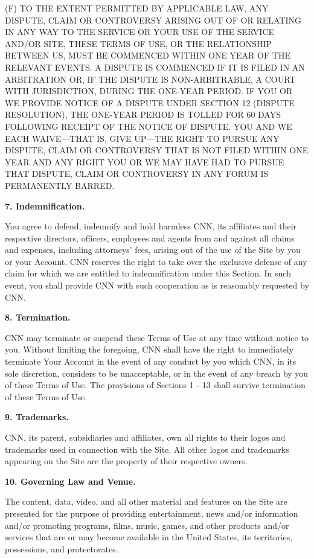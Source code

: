 (F) TO THE EXTENT PERMITTED BY APPLICABLE LAW, ANY DISPUTE, CLAIM OR
CONTROVERSY ARISING OUT OF OR RELATING IN ANY WAY TO THE SERVICE OR YOUR
USE OF THE SERVICE AND/OR SITE, THESE TERMS OF USE, OR THE RELATIONSHIP
BETWEEN US, MUST BE COMMENCED WITHIN ONE YEAR OF THE RELEVANT EVENTS. A
DISPUTE IS COMMENCED IF IT IS FILED IN AN ARBITRATION OR, IF THE DISPUTE
IS NON-ARBITRABLE, A COURT WITH JURISDICTION, DURING THE ONE-YEAR
PERIOD. IF YOU OR WE PROVIDE NOTICE OF A DISPUTE UNDER SECTION 12
(DISPUTE RESOLUTION), THE ONE-YEAR PERIOD IS TOLLED FOR 60 DAYS
FOLLOWING RECEIPT OF THE NOTICE OF DISPUTE. YOU AND WE EACH WAIVE---THAT
IS, GIVE UP---THE RIGHT TO PURSUE ANY DISPUTE, CLAIM OR CONTROVERSY THAT
IS NOT FILED WITHIN ONE YEAR AND ANY RIGHT YOU OR WE MAY HAVE HAD TO
PURSUE THAT DISPUTE, CLAIM OR CONTROVERSY IN ANY FORUM IS PERMANENTLY
BARRED.

\textbf{7. Indemnification.}

You agree to defend, indemnify and hold harmless CNN, its affiliates and
their respective directors, officers, employees and agents from and
against all claims and expenses, including attorneys' fees, arising out
of the use of the Site by you or your Account. CNN reserves the right to
take over the exclusive defense of any claim for which we are entitled
to indemnification under this Section. In such event, you shall provide
CNN with such cooperation as is reasonably requested by CNN.

\textbf{8. Termination.}

CNN may terminate or suspend these Terms of Use at any time without
notice to you. Without limiting the foregoing, CNN shall have the right
to immediately terminate Your Account in the event of any conduct by you
which CNN, in its sole discretion, considers to be unacceptable, or in
the event of any breach by you of these Terms of Use. The provisions of
Sections 1 - 13 shall survive termination of these Terms of Use.

\textbf{9. Trademarks.}

CNN, its parent, subsidiaries and affiliates, own all rights to their
logos and trademarks used in connection with the Site. All other logos
and trademarks appearing on the Site are the property of their
respective owners.

\textbf{10. Governing Law and Venue.}

The content, data, video, and all other material and features on the
Site are presented for the purpose of providing entertainment, news
and/or information and/or promoting programs, films, music, games, and
other products and/or services that are or may become available in the
United States, its territories, possessions, and protectorates.

